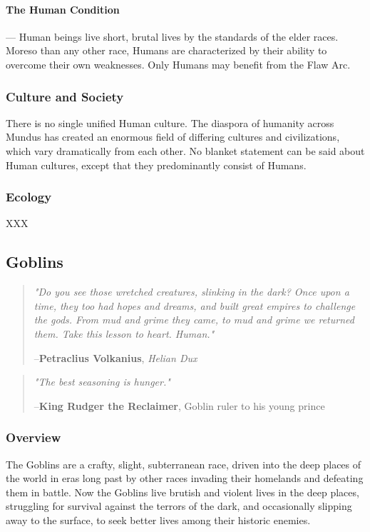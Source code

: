 \documentclass[oneside,11pt,english]{book}
\begin{document}
\paragraph{\label{par:The Human Condition}The Human Condition}---\quad
Human beings live short, brutal lives by the standards of the elder races. Moreso than any other 
race, Humans are characterized by their ability to overcome their own weaknesses. Only Humans 
may benefit from the Flaw Arc. 
\subsubsection*{Culture and Society} 
There is no single unified Human culture. The diaspora of humanity across Mundus has created an 
enormous field of differing cultures and civilizations, which vary dramatically from each other. No blanket statement can be said about Human cultures, except that they predominantly consist of Humans.
\subsubsection*{Ecology} 
XXX 
\subsection{Goblins}
\begin{quotation}
	\emph{"Do you see those wretched creatures, slinking in the dark? Once upon a time, they too had hopes and dreams, and built great empires to challenge the gods. From mud and grime they came, to mud and grime we returned them. Take this lesson to heart. Human."}\par
	\hfill--\textbf{Petraclius Volkanius}, \textit{Helian Dux}
\end{quotation}
\begin{quotation} 
	\emph{"The best seasoning is hunger."}

	\hfill--\textbf{King Rudger the Reclaimer}, Goblin ruler to his young prince 
\end{quotation}
\subsubsection*{Overview} 
The Goblins are a crafty, slight, subterranean race, driven into the deep places of the world in eras long 
past by other races invading their homelands and defeating them in battle. Now the Goblins live brutish 
and violent lives in the deep places, struggling for survival against the terrors of the dark, and 
occasionally slipping away to the surface, to seek better lives among their historic enemies. 
\end{document}
